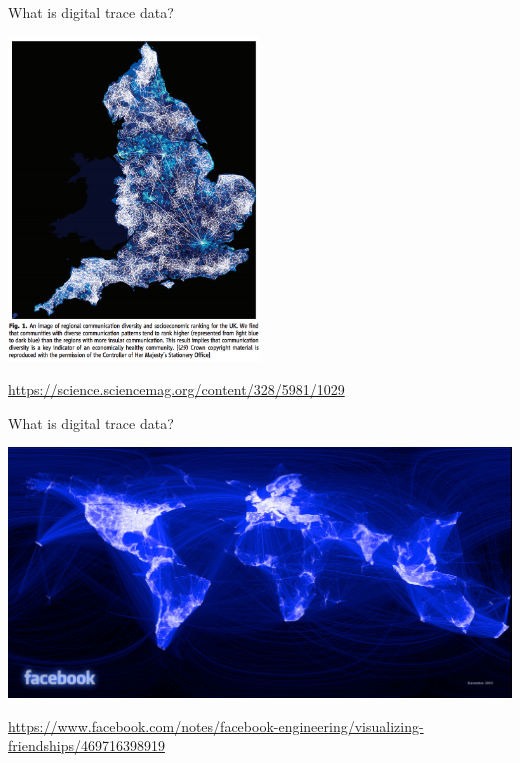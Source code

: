 \documentclass{beamer}
\def\vf{\vfill}
\begin{document}
\begin{frame}{What is digital trace data?}

\begin{center}
	\includegraphics[width=0.50\textwidth]{figures/eagle_et_al.png}
\end{center}

\vf
\tiny{\url{https://science.sciencemag.org/content/328/5981/1029}}

\end{frame}

\begin{frame}{What is digital trace data?}

\begin{center}
	\includegraphics[width=1\textwidth]{figures/facebook_map.png}
\end{center}

\vf
\tiny{\url{https://www.facebook.com/notes/facebook-engineering/visualizing-friendships/469716398919}}

\end{frame}
\end{document}
